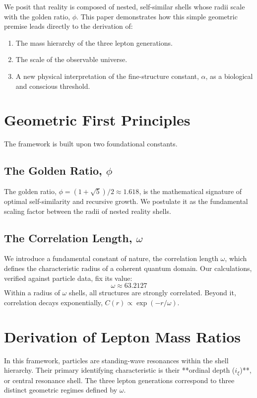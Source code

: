 \documentclass[12pt,a4paper,twocolumn]{article}
\begin{document}
We posit that reality is composed of nested, self-similar shells whose radii scale with the golden ratio, $\phi$. This paper demonstrates how this simple geometric premise leads directly to the derivation of:
\begin{enumerate}
    \item The mass hierarchy of the three lepton generations.
    \item The scale of the observable universe.
    \item A new physical interpretation of the fine-structure constant, $\alpha$, as a biological and conscious threshold.
\end{enumerate}

\section{Geometric First Principles}
The framework is built upon two foundational constants.

\subsection{The Golden Ratio, $\phi$}
The golden ratio, $\phi = (1+\sqrt{5})/2 \approx 1.618$, is the mathematical signature of optimal self-similarity and recursive growth. We postulate it as the fundamental scaling factor between the radii of nested reality shells.

\subsection{The Correlation Length, $\omega$}
We introduce a fundamental constant of nature, the correlation length $\omega$, which defines the characteristic radius of a coherent quantum domain. Our calculations, verified against particle data, fix its value:
\begin{equation}
    \omega \approx 63.2127
\end{equation}
Within a radius of $\omega$ shells, all structures are strongly correlated. Beyond it, correlation decays exponentially, $C(r) \propto \exp(-r/\omega)$.

\section{Derivation of Lepton Mass Ratios}
In this framework, particles are standing-wave resonances within the shell hierarchy. Their primary identifying characteristic is their **ordinal depth ($i_\xi$)**, or central resonance shell. The three lepton generations correspond to three distinct geometric regimes defined by $\omega$.
\end{document}
